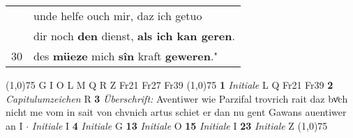 \documentclass[8pt,a4paper,notitlepage]{article}
\begin{document}
\begin{table}[ht]
\begin{minipage}[t]{0.5\linewidth}
\begin{tabular}{rl}
 & unde helfe ouch mir, daz ich getuo\\ 
 & dir noch \textbf{den} dienst, \textbf{als ich kan geren}.\\ 
30 & des \textbf{müeze} mich \textbf{sîn} kraft \textbf{geweren}."\\ 
\end{tabular}
\scriptsize
\line(1,0){75} \newline
G I O L M Q R Z Fr21 Fr27 Fr39 \newline
\line(1,0){75} \newline
\textbf{1} \textit{Initiale} L Q Fr21 Fr39  \textbf{2} \textit{Capitulumzeichen} R  \textbf{3} \textit{Überschrift:} Aventiwer wie Parzifal trovrich rait daz bvͦch nicht me vom in sait von chvnich artus schiet er dan nu gent Gawans auentiwer an I   $\cdot$ \textit{Initiale} I  \textbf{4} \textit{Initiale} G  \textbf{13} \textit{Initiale} O  \textbf{15} \textit{Initiale} I  \textbf{23} \textit{Initiale} Z  \newline
\line(1,0){75} \newline

\end{minipage}
\end{table}
\end{document}

